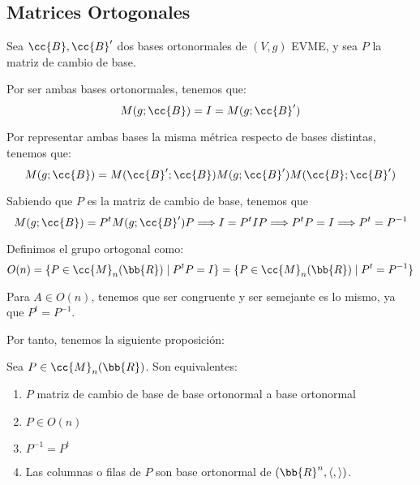 \subsection{Matrices Ortogonales}
Sea $\cc{B}, \cc{B}'$ dos bases ortonormales de $(V,g)$ EVME, y sea $P$ la matriz de cambio de base.

Por ser ambas bases ortonormales, tenemos que:
\begin{equation*}
    M(g;\cc{B}) = I = M(g;\cc{B}')
\end{equation*}

Por representar ambas bases la misma métrica respecto de bases distintas, tenemos que:
\begin{equation*}
    M(g;\cc{B}) = M(\cc{B}';\cc{B}) M(g;\cc{B}') M(\cc{B};\cc{B}')
\end{equation*}

Sabiendo que $P$ es la matriz de cambio de base, tenemos que
\begin{equation*}
    M(g;\cc{B}) = P^t M(g;\cc{B}') P \Longrightarrow I=P^t IP \Longrightarrow P^tP=I \Longrightarrow P^t = P^{-1}
\end{equation*}

\begin{definicion}
    Definimos el grupo ortogonal como:
    \begin{equation*}
        O(n) = \{P\in \cc{M}_n(\bb{R})\mid P^tP = I\}
        = \{P\in \cc{M}_n(\bb{R})\mid P^t=P^{-1}\}
    \end{equation*}
\end{definicion}

\begin{observacion}
    Para $A\in O(n)$, tenemos que ser congruente y ser semejante es lo mismo, ya que $P^t = P^{-1}$.
\end{observacion}

Por tanto, tenemos la siguiente proposición:
\begin{prop} Sea $P\in \cc{M}_n(\bb{R})$. Son equivalentes:
\begin{enumerate}
    \item $P$ matriz de cambio de base de base ortonormal a base ortonormal
    \item $P \in O(n)$
    \item $P^{-1}=P^t$
    \item Las columnas o filas de $P$ son base ortonormal de $(\bb{R}^n,\langle,\rangle)$.
\end{enumerate}
\end{prop}

